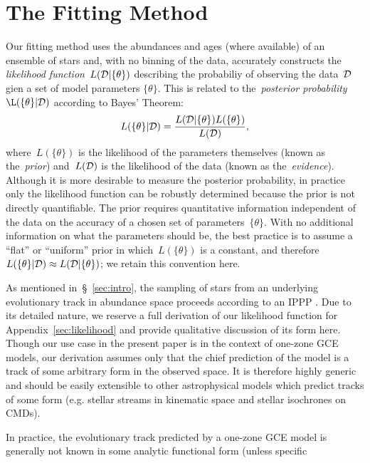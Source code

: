 \documentclass[ms.tex]{subfiles}
\begin{document}
\section{The Fitting Method}
\label{sec:fitting}

Our fitting method uses the abundances and ages (where available) of an
ensemble of stars and, with no binning of the data, accurately constructs the
\textit{likelihood function}~$L(\mathcal{D} | \{\theta\})$ describing the
probabiliy of observing the data~$\mathcal{D}$ gien a set of model parameters
$\{\theta\}$.
This is related to the~\textit{posterior probability}
$\L(\{\theta\} | \script{D})$ according to Bayes' Theorem:
\begin{equation}
L(\{\theta\} | \mathcal{D}) = \frac{
	L(\mathcal{D} | \{\theta\}) L(\{\theta\})
}{
	L(\mathcal{D})
},
\label{eq:bayes}
\end{equation}
where~$L(\{\theta\})$ is the likelihood of the parameters themselves (known as
the~\textit{prior}) and~$L(\mathcal{D})$ is the likelihood of the data (known as
the~\textit{evidence}).
Although it is more desirable to measure the posterior probability, in practice
only the likelihood function can be robustly determined because the prior is
not directly quantifiable.
The prior requires quantitative information independent of the data on the
accuracy of a chosen set of parameters~$\{\theta\}$.
With no additional information on what the parameters should be, the best
practice is to assume a ``flat'' or ``uniform'' prior in which~$L(\{\theta\})$
is a constant, and therefore~$L(\{\theta\} | \mathcal{D}) \approx
L(\mathcal{D} | \{\theta\})$; we retain this convention here.
\par
As mentioned in~\S~\ref{sec:intro}, the sampling of stars from an underlying
evolutionary track in abundance space proceeds according to an IPPP
\citep[e.g.][]{Press2007}.
Due to its detailed nature, we reserve a full derivation of our likelihood
function for Appendix~\ref{sec:likelihood} and provide qualitative discussion
of its form here.
Though our use case in the present paper is in the context of one-zone GCE
models, our derivation assumes only that the chief prediction of the model is
a track of some arbitrary form in the observed space.
It is therefore highly generic and should be easily extensible to other
astrophysical models which predict tracks of some form (e.g. stellar streams
in kinematic space and stellar isochrones on CMDs).
\par
In practice, the evolutionary track predicted by a one-zone GCE model is
generally not known in some analytic functional form (unless specific
\end{document}
